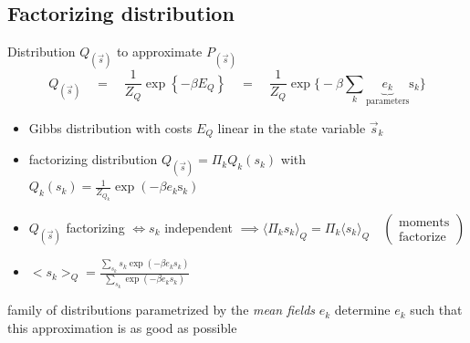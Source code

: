 \begin{frame}{\secname}
{}



 
\end{frame}

\subsection{Factorizing distribution}

\begin{frame}{\subsecname}
\begin{block}{Distribution $Q_{(\vec{s})}$ to approximate $P_{(\vec{s})}$}
\vspace{-0.35cm}
\begin{equation}
	Q_{(\vec{s})} \quad
= \quad \frac{1}{Z_Q} \exp \left\{ -\beta E_Q\right\} \quad
= \quad \frac{1}{Z_Q} \exp \Big\{ -\beta \sum\limits_{k}
		\underbrace{ e_k }_{ \text{parameters} } \mathrm{s}_k \Big\}
\end{equation}
\vspace{-0.65cm}
\begin{itemize}
 \item Gibbs distribution with costs $E_Q$ linear in the state variable $\vec{s}_k$
 \item factorizing distribution $Q_{(\vec{s})} = \Pi_k Q_k(s_k)$ with $Q_k(s_k) 
 = \frac{1}{Z_{Q_k}} \exp (-\beta e_k\mathrm{s}_k)$
 \item $Q_{(\vec{s})}$ factorizing $\iff s_k$ independent $\implies
    \langle \Pi_k s_k \rangle_Q = \Pi_k \langle s_k\rangle_Q
    \quad \!\! (\substack{\text{moments}  \\ \text{factorize}})$
 \item
 $ \big< s_k \big>_Q = \frac{\sum\limits_{s_k} s_k \exp(-\beta e_k s_k)}{
					\sum\limits_{s_k} \exp(-\beta e_k s_k)}$
\end{itemize}
\end{block}
\begin{itemize}
      \itr family of distributions parametrized by the \emph{mean fields} $e_k$
      \itr determine $e_k$ such that this approximation is as good as possible
\end{itemize}
\end{frame}



